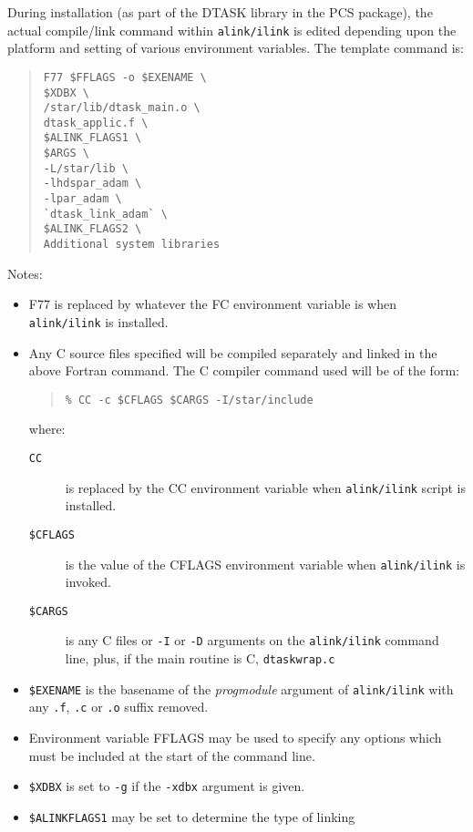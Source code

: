 \documentclass[twoside,11pt]{article}
\newcommand{\xref}[3]{#1}
\renewcommand{\_}{\texttt{\symbol{95}}}
\begin{document}
During installation (as part of the DTASK library in the 
\xref{PCS}{ssn29}{}
package), the actual compile/link command within \texttt{alink/ilink} is edited
depending upon the platform and setting of various environment variables.
The template command is:
\begin{quote} \begin{verbatim}
F77 $FFLAGS -o $EXENAME \
$XDBX \
/star/lib/dtask_main.o \
dtask_applic.f \
$ALINK_FLAGS1 \
$ARGS \
-L/star/lib \
-lhdspar_adam \
-lpar_adam \
`dtask_link_adam` \
$ALINK_FLAGS2 \
Additional system libraries
\end{verbatim} \end{quote}
Notes:
\begin{itemize}
\item F77 is replaced by whatever the FC environment variable is when 
\texttt{alink/ilink} is installed.
\item Any C source files specified will be compiled separately and linked in
the above Fortran command.  The C compiler command used will be of the form:
\begin{quote}\begin{verbatim}
% CC -c $CFLAGS $CARGS -I/star/include
\end{verbatim} \end{quote}
where:
\begin{description}
\item[\texttt{CC}] is replaced by the CC environment variable when 
\texttt{alink/ilink} script is installed.
\item[\texttt{\$CFLAGS}] is the value of the CFLAGS environment variable when 
\texttt{alink/ilink} is invoked.
\item[\texttt{\$CARGS}] is any C files or \texttt{-I} or \texttt{-D} arguments
on the \texttt{alink/ilink} command line, plus, if the main routine is C,
\texttt{dtask\_wrap.c}\end{description}
\item \texttt{\$EXENAME} is the basename of the \textit{prog\_module}
argument of \texttt{alink/ilink} with any \texttt{.f}, \texttt{.c} or 
\texttt{.o} suffix removed. 
\item Environment variable FFLAGS may be used to specify any options which
must be included at the start of the command line.
\item \texttt{\$XDBX} is set to \texttt{-g} if the \texttt{-xdbx} argument 
is given.
\item \texttt{\$ALINK\_FLAGS1} may be set to determine the type of linking

\end{itemize}
\end{document}
